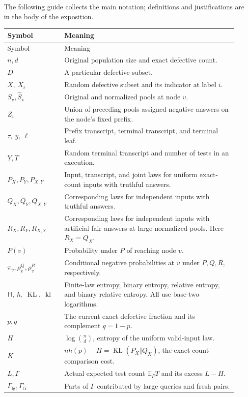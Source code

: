 \documentclass[11pt]{article}
\theoremstyle{definition}
\theoremstyle{remark}
\newcommand{\E}{\mathbb E}
\newcommand{\Ent}{\mathsf H}
\newcommand{\KL}{\operatorname{KL}}
\newcommand{\kl}{\operatorname{kl}}
\newcommand{\Glg}{\Gamma_{\mathrm{lg}}}
\newcommand{\Gfr}{\Gamma_{\mathrm{fr}}}
\numberwithin{equation}{section}
\begin{document}
The following guide collects the main notation; definitions and
justifications are in the body of the exposition.
\begin{longtable}{p{0.23\linewidth}p{0.70\linewidth}}
\toprule
Symbol&Meaning\\
\midrule
\endfirsthead
\toprule
Symbol&Meaning\\
\midrule
\endhead
\bottomrule
\endfoot
\(n,d\)&Original population size and exact defective count.\\
\(D\)&A particular defective subset.\\
\(X,\ X_i\)&Random defective subset and its indicator at label \(i\).\\
\(S_v,\widehat S_v\)&Original and normalized pools at node \(v\).\\
\(Z_v\)&Union of preceding pools assigned negative answers on the
node's fixed prefix.\\
\(\tau,\ y,\ \ell\)&Prefix transcript, terminal transcript, and terminal leaf.\\
\(Y,T\)&Random terminal transcript and number of tests in an execution.\\
\(P_X,P_Y,P_{X,Y}\)&Input, transcript, and joint laws for uniform
exact-count inputs with truthful answers.\\
\(Q_X,Q_Y,Q_{X,Y}\)&Corresponding laws for independent inputs with truthful answers.\\
\(R_X,R_Y,R_{X,Y}\)&Corresponding laws for independent inputs with artificial
fair answers at large normalized pools. Here \(R_X=Q_X\).\\
\(P(v)\)&Probability under \(P\) of reaching node \(v\).\\
\(\pi_v,\rho_v^Q,\rho_v^R\)&Conditional negative probabilities at \(v\)
under \(P,Q,R\), respectively.\\
\(\Ent,\ h,\ \KL,\ \kl\)&Finite-law entropy, binary entropy, relative entropy,
and binary relative entropy. All use base-two logarithms.\\
\(p,q\)&The current exact defective fraction and its complement \(q=1-p\).\\
\(H\)&\(\log\binom nd\), entropy of the uniform valid-input law.\\
\(K\)&\(nh(p)-H=\KL(P_X\Vert Q_X)\), the exact-count comparison cost.\\
\(L,\Gamma\)&Actual expected test count \(\E_P T\) and its excess \(L-H\).\\
\(\Glg,\Gfr\)&Parts of \(\Gamma\) contributed by large queries and fresh pairs.\\

\end{longtable}
\end{document}
